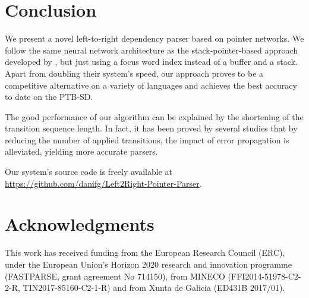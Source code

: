 \documentclass[11pt,a4paper]{article}
\begin{document}
\section{Conclusion}
We present a novel left-to-right dependency parser based on pointer networks. We follow the same neural network architecture as the stack-pointer-based approach developed by \citet{Ma18}, but just using a focus word index instead of a buffer and a stack. Apart from doubling their system's speed, our approach proves to be a competitive alternative on a variety of languages and achieves the best accuracy to date on the PTB-SD. 

The good performance of our algorithm can be explained by the shortening of the transition sequence length. In fact, it has been proved by several studies \cite{buffertrans, Qi2017, Fernandez18} that by reducing the number of applied transitions, the impact of error propagation is alleviated, yielding more accurate parsers.

Our system's source code is freely available at \url{https://github.com/danifg/Left2Right-Pointer-Parser}.

\section*{Acknowledgments}

This work has received funding from the European
Research Council (ERC), under the European
Union's Horizon 2020 research and innovation
programme (FASTPARSE, grant agreement No
714150), from 
MINECO (FFI2014-51978-C2-2-R, TIN2017-85160-C2-1-R)
and from Xunta de Galicia (ED431B 2017/01).




\end{document}

